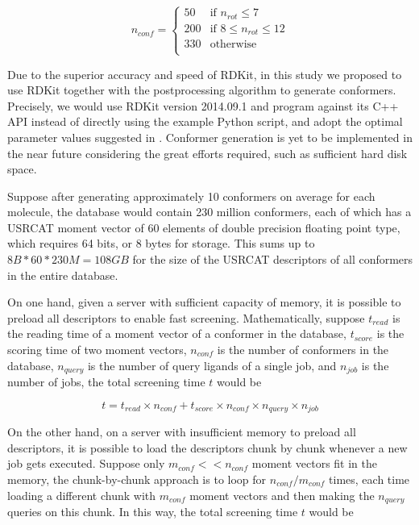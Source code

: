 \begin{equation}
n_{conf}=
\begin{cases}
 50 & \text{if } n_{rot} \leq 7\\
200 & \text{if } 8 \leq n_{rot} \leq 12\\
330 & \text{otherwise}\\
\end{cases}
\label{usr:n_c}
\end{equation}

Due to the superior accuracy and speed of RDKit, in this study we proposed to use RDKit together with the postprocessing algorithm to generate conformers. Precisely, we would use RDKit version 2014.09.1 and program against its C++ API instead of directly using the example Python script, and adopt the optimal parameter values suggested in \citep{1127}. Conformer generation is yet to be implemented in the near future considering the great efforts required, such as sufficient hard disk space.%

Suppose after generating approximately 10 conformers on average for each molecule, the database would contain 230 million conformers, each of which has a USRCAT moment vector of 60 elements of double precision floating point type, which requires 64 bits, or 8 bytes for storage. This sums up to $8B*60*230M=108GB$ for the size of the USRCAT descriptors of all conformers in the entire database.

On one hand, given a server with sufficient capacity of memory, it is possible to preload all descriptors to enable fast screening. Mathematically, suppose $t_{read}$ is the reading time of a moment vector of a conformer in the database, $t_{score}$ is the scoring time of two moment vectors, $n_{conf}$ is the number of conformers in the database, $n_{query}$ is the number of query ligands of a single job, and $n_{job}$ is the number of jobs, the total screening time $t$ would be

\begin{equation}
t=t_{read}\times n_{conf}+t_{score}\times n_{conf}\times n_{query}\times n_{job}
\label{usr:time0}
\end{equation}

On the other hand, on a server with insufficient memory to preload all descriptors, it is possible to load the descriptors chunk by chunk whenever a new job gets executed. Suppose only $m_{conf} << n_{conf}$ moment vectors fit in the memory, the chunk-by-chunk approach is to loop for $n_{conf}/m_{conf}$ times, each time loading a different chunk with $m_{conf}$ moment vectors and then making the $n_{query}$ queries on this chunk. In this way, the total screening time $t$ would be

